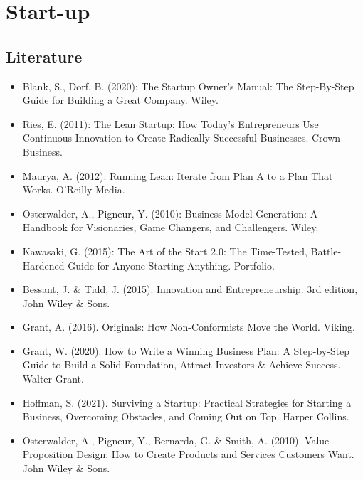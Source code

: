     \chapter{Start-up}

    \section{Literature}
    \begin{itemize}
        \item Blank, S., Dorf, B. (2020): The Startup Owner's Manual: The Step-By-Step Guide for Building a Great Company. Wiley.
        \item Ries, E. (2011): The Lean Startup: How Today's Entrepreneurs Use Continuous Innovation to Create Radically Successful Businesses. Crown Business.
        \item Maurya, A. (2012): Running Lean: Iterate from Plan A to a Plan That Works. O'Reilly Media.
        \item Osterwalder, A., Pigneur, Y. (2010): Business Model Generation: A Handbook for Visionaries, Game Changers, and Challengers. Wiley.
        \item Kawasaki, G. (2015): The Art of the Start 2.0: The Time-Tested, Battle-Hardened Guide for Anyone Starting Anything. Portfolio.
        \item Bessant, J. \& Tidd, J. (2015). Innovation and Entrepreneurship. 3rd edition, John Wiley \& Sons.
        \item Grant, A. (2016). Originals: How Non-Conformists Move the World. Viking.
        \item Grant, W. (2020). How to Write a Winning Business Plan: A Step-by-Step Guide to Build a Solid Foundation, Attract Investors \& Achieve Success. Walter Grant.
        \item Hoffman, S. (2021). Surviving a Startup: Practical Strategies for Starting a Business, Overcoming Obstacles, and Coming Out on Top. Harper Collins.
        \item Osterwalder, A., Pigneur, Y., Bernarda, G. \& Smith, A. (2010). Value Proposition Design: How to Create Products and Services Customers Want. John Wiley \& Sons.
    \end{itemize}
